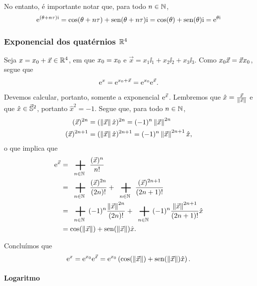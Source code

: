 No entanto, é importante notar que, para todo $n \in \N$,
	\begin{equation*}
	\e^{(\theta+n\tau) \ii} = \cos(\theta+n\tau)+\sin(\theta+n\tau) \ii = \cos(\theta)+\sin(\theta) \ii = \e^{\theta \ii}
	\end{equation*}

\subsubsection{Exponencial dos quatérnios $\R^4$}

Seja $x = \esc{x} + \vec{x} \in \R^4$, em que $\esc{x} = x_0$ e $\vec{x} = x_1 \ii_1 + x_2 \ii_2 + x_3 \ii_3$. Como $\esc{x}\vec{x} = \vec{x}\esc{x}$, segue que
	\begin{equation*}
	\e^{x} = \e^{\esc{x}+\vec{x}} = \e^{\esc{x}}\e^{\vec{x}}.
	\end{equation*}

Devemos calcular, portanto, somente a exponencial $\e^{\vec{x}}$. Lembremos que $\hat{x} = \frac{\vec{x}}{\nor{\vec{x}}}$ e que $\hat{x} \in \vec{\S}^2$, portanto $\hat{x}^2 = -1$. Segue que, para todo $n \in \N$,
	\begin{align*}
	(\vec{x})^{2n} &= (\nor{\vec{x}} \hat{x})^{2n} = (-1)^n \nor{\vec{x}}^{2n} \\
	(\vec{x})^{2n+1} &= (\nor{\vec{x}} \hat{x})^{2n+1} = (-1)^n \nor{\vec{x}}^{2n+1}\hat{x},
	\end{align*}
o que implica que
	\begin{align*}
	\e^{\vec{x}} &= \sum_{n \in \N} \frac{(\vec{x})^n}{n!} \\
		&= \sum_{n \in \N} \frac{(\vec{x})^{2n}}{(2n)!} + \sum_{n \in \N} \frac{(\vec{x})^{2n+1}}{(2n+1)!} \\
		&= \sum_{n \in \N} (-1)^n \frac{\nor{\vec{x}}^{2n}}{(2n)!} + \sum_{n \in \N} (-1)^n \frac{\nor{\vec{x}}^{2n+1}}{(2n+1)!}\hat{x} \\
		&= \cos(\nor{\vec{x}}) + \sin(\nor{\vec{x}}) \hat{x}.
	\end{align*}

Concluímos que
	\begin{equation*}
		\e^{x} = \e^{\esc{x}}\e^{\vec{x}} = \e^{\esc{x}}\left( \cos(\nor{\vec{x}}) + \sin(\nor{\vec{x}}) \hat{x} \right).
	\end{equation*}

\paragraph{Logaritmo}

